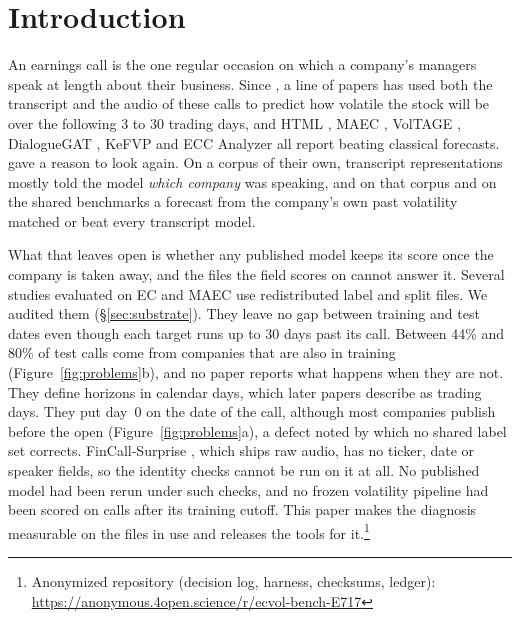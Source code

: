 \section{Introduction}
\label{sec:intro}

An earnings call is the one regular occasion on which a company's managers speak
at length about their business. Since \citet{qin2019what}, a line of papers has
used both the transcript and the audio of these calls to predict how volatile the
stock will be over the following 3 to 30 trading days, and HTML
\citep{yang2020html}, MAEC \citep{li2020maec}, VolTAGE \citep{sawhney2020voltage},
DialogueGAT \citep{sang2022dialoguegat}, KeFVP \citep{niu2023kefvp} and ECC
Analyzer \citep{cao2024ecc} all report beating classical forecasts.
\citet{scss2024} gave a reason to look again. On a corpus of their own, transcript
representations mostly told the model \emph{which company} was speaking, and on
that corpus and on the shared benchmarks a forecast from the company's own past
volatility matched or beat every transcript model.

What that leaves open is whether any published model keeps its score once the
company is taken away, and the files the field scores on cannot answer it. Several studies evaluated on EC and MAEC use redistributed label and split files. We audited them (\S\ref{sec:substrate}). They leave no gap between
training and test dates even though each target runs up to 30 days past its call.
Between 44\% and 80\% of test calls come from companies that are also in
training (Figure~\ref{fig:problems}b), and no paper
reports what happens when they are not. They define horizons in calendar days,
which later papers describe as trading days. They put day~0 on the date of the
call, although most companies publish before the open
(Figure~\ref{fig:problems}a), a defect noted by
\citet{scss2024} which no shared label set corrects. FinCall-Surprise
\citep{fincall2025}, which ships raw audio, has no ticker, date or speaker
fields, so the identity checks cannot be run on it at all. No published model had
been rerun under such checks, and no frozen volatility pipeline had been scored
on calls after its training cutoff. This paper makes the diagnosis measurable on the
files in use and releases the tools for it.\footnote{Anonymized repository (decision
log, harness, checksums, ledger): \url{https://anonymous.4open.science/r/ecvol-bench-E717}}



